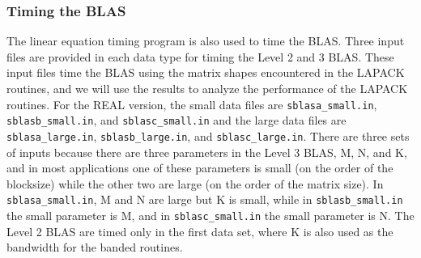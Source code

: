 \documentclass[11pt]{report}
\begin{document}
\subsubsection{Timing the BLAS}\label{timeblas}

The linear equation timing program is also used to time the BLAS.
Three input files are provided in each data type for timing the Level
2 and 3 BLAS.
These input files time the BLAS using the matrix shapes encountered
in the LAPACK routines, and we will use the results to analyze the
performance of the LAPACK routines.
For the REAL version, the small data files are
\texttt{sblasa\_small.in}, \texttt{sblasb\_small.in}, and \texttt{sblasc\_small.in}
and the large data files are
\texttt{sblasa\_large.in}, \texttt{sblasb\_large.in}, and \texttt{sblasc\_large.in}.
There are three sets of inputs because there are three
parameters in the Level 3 BLAS, M, N, and K, and
in most applications one of these parameters is small (on the order
of the blocksize) while the other two are large (on the order of the
matrix size).
In \texttt{sblasa\_small.in}, M and N are large but K is
small, while in \texttt{sblasb\_small.in} the small parameter is M, and
in \texttt{sblasc\_small.in} the small parameter is N.
The Level 2 BLAS are timed only in the first data set, where K
is also used as the bandwidth for the banded routines.
\end{document}
